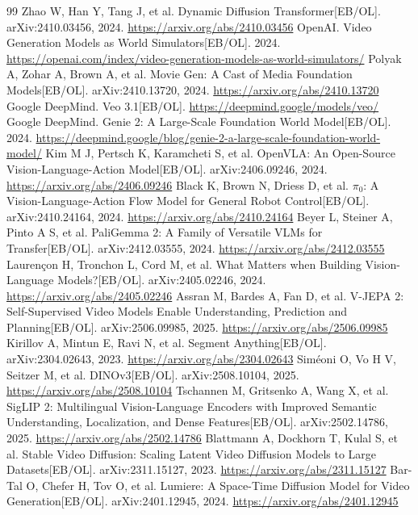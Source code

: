 \documentclass[UTF8,a4paper,12pt]{ctexart}
\begin{document}
\begin{thebibliography}{99}
 Zhao W, Han Y, Tang J, et al. Dynamic Diffusion Transformer[EB/OL]. arXiv:2410.03456, 2024. \url{https://arxiv.org/abs/2410.03456}
 OpenAI. Video Generation Models as World Simulators[EB/OL]. 2024. \url{https://openai.com/index/video-generation-models-as-world-simulators/}
 Polyak A, Zohar A, Brown A, et al. Movie Gen: A Cast of Media Foundation Models[EB/OL]. arXiv:2410.13720, 2024. \url{https://arxiv.org/abs/2410.13720}
 Google DeepMind. Veo 3.1[EB/OL]. \url{https://deepmind.google/models/veo/}
 Google DeepMind. Genie 2: A Large-Scale Foundation World Model[EB/OL]. 2024. \url{https://deepmind.google/blog/genie-2-a-large-scale-foundation-world-model/}
 Kim M J, Pertsch K, Karamcheti S, et al. OpenVLA: An Open-Source Vision-Language-Action Model[EB/OL]. arXiv:2406.09246, 2024. \url{https://arxiv.org/abs/2406.09246}
 Black K, Brown N, Driess D, et al. $\pi_0$: A Vision-Language-Action Flow Model for General Robot Control[EB/OL]. arXiv:2410.24164, 2024. \url{https://arxiv.org/abs/2410.24164}
 Beyer L, Steiner A, Pinto A S, et al. PaliGemma 2: A Family of Versatile VLMs for Transfer[EB/OL]. arXiv:2412.03555, 2024. \url{https://arxiv.org/abs/2412.03555}
 Lauren{\c c}on H, Tronchon L, Cord M, et al. What Matters when Building Vision-Language Models?[EB/OL]. arXiv:2405.02246, 2024. \url{https://arxiv.org/abs/2405.02246}
 Assran M, Bardes A, Fan D, et al. V-JEPA 2: Self-Supervised Video Models Enable Understanding, Prediction and Planning[EB/OL]. arXiv:2506.09985, 2025. \url{https://arxiv.org/abs/2506.09985}
 Kirillov A, Mintun E, Ravi N, et al. Segment Anything[EB/OL]. arXiv:2304.02643, 2023. \url{https://arxiv.org/abs/2304.02643}
 Sim{\'e}oni O, Vo H V, Seitzer M, et al. DINOv3[EB/OL]. arXiv:2508.10104, 2025. \url{https://arxiv.org/abs/2508.10104}
 Tschannen M, Gritsenko A, Wang X, et al. SigLIP 2: Multilingual Vision-Language Encoders with Improved Semantic Understanding, Localization, and Dense Features[EB/OL]. arXiv:2502.14786, 2025. \url{https://arxiv.org/abs/2502.14786}
 Blattmann A, Dockhorn T, Kulal S, et al. Stable Video Diffusion: Scaling Latent Video Diffusion Models to Large Datasets[EB/OL]. arXiv:2311.15127, 2023. \url{https://arxiv.org/abs/2311.15127}
 Bar-Tal O, Chefer H, Tov O, et al. Lumiere: A Space-Time Diffusion Model for Video Generation[EB/OL]. arXiv:2401.12945, 2024. \url{https://arxiv.org/abs/2401.12945}

\end{thebibliography}
\end{document}
